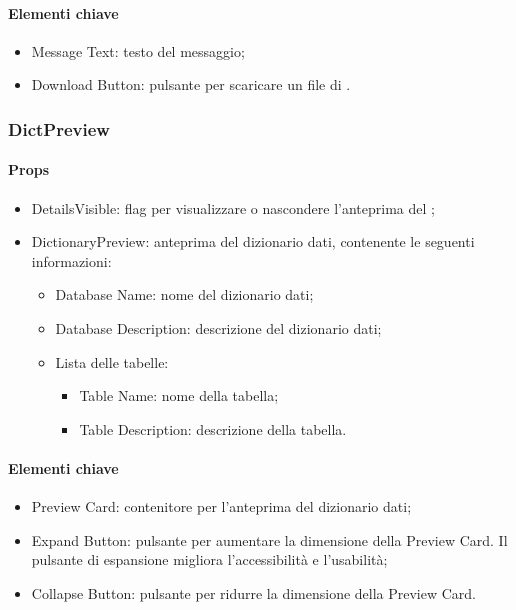 \paragraph*{Elementi chiave}
\begin{itemize}
  \item Message Text: testo del messaggio;
  \item Download Button: pulsante per scaricare un file di .
\end{itemize}

\subsubsection{DictPreview}

\paragraph*{Props}
\begin{itemize}
  \item DetailsVisible: flag per visualizzare o nascondere l'anteprima del ;
  \item DictionaryPreview: anteprima del dizionario dati, contenente le seguenti informazioni:
  \begin{itemize}
    \item Database Name: nome del dizionario dati;
    \item Database Description: descrizione del dizionario dati;
    \item Lista delle tabelle: 
    \begin{itemize}
      \item Table Name: nome della tabella;
      \item Table Description: descrizione della tabella.
    \end{itemize}
  \end{itemize}
\end{itemize}

\paragraph*{Elementi chiave}
\begin{itemize}
  \item Preview Card: contenitore per l'anteprima del dizionario dati;
  \item Expand Button: pulsante per aumentare la dimensione della Preview Card. Il pulsante di espansione migliora l'accessibilità e l'usabilità;
  \item Collapse Button: pulsante per ridurre la dimensione della Preview Card.
\end{itemize}

